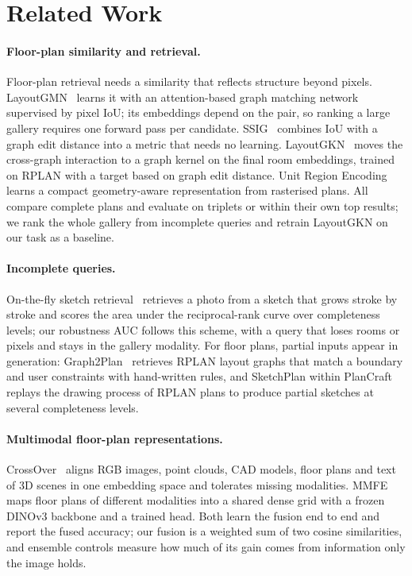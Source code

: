 \section{Related Work}
\label{sec:related}


\paragraph{Floor-plan similarity and retrieval.}
Floor-plan retrieval needs a similarity that reflects structure beyond pixels.
LayoutGMN~\cite{patil2021layoutgmn} learns it with an attention-based graph matching network supervised by pixel IoU; its embeddings depend on the pair, so ranking a large gallery requires one forward pass per candidate.
SSIG~\cite{vanengelenburg2023ssig} combines IoU with a graph edit distance into a metric that needs no learning.
LayoutGKN~\cite{vanengelenburg2025layoutgkn} moves the cross-graph interaction to a graph kernel on the final room embeddings, trained on RPLAN with a target based on graph edit distance.
Unit Region Encoding~\cite{zhang2025urenet} learns a compact geometry-aware representation from rasterised plans.
All compare complete plans and evaluate on triplets or within their own top results; we rank the whole gallery from incomplete queries and retrain LayoutGKN on our task as a baseline.

\paragraph{Incomplete queries.}
On-the-fly sketch retrieval~\cite{bhunia2020sketchless} retrieves a photo from a sketch that grows stroke by stroke and scores the area under the reciprocal-rank curve over completeness levels; our robustness AUC follows this scheme, with a query that loses rooms or pixels and stays in the gallery modality.
For floor plans, partial inputs appear in generation: Graph2Plan~\cite{hu2020graph2plan} retrieves RPLAN layout graphs that match a boundary and user constraints with hand-written rules, and SketchPlan within PlanCraft~\cite{zeng2026plancraft} replays the drawing process of RPLAN plans to produce partial sketches at several completeness levels.

\paragraph{Multimodal floor-plan representations.}
CrossOver~\cite{sarkar2025crossover} aligns RGB images, point clouds, CAD models, floor plans and text of 3D scenes in one embedding space and tolerates missing modalities.
MMFE~\cite{anadon2026mmfe} maps floor plans of different modalities into a shared dense grid with a frozen DINOv3 backbone and a trained head.
Both learn the fusion end to end and report the fused accuracy; our fusion is a weighted sum of two cosine similarities, and ensemble controls measure how much of its gain comes from information only the image holds.


